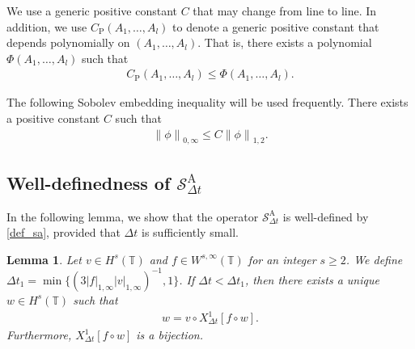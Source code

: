 \documentclass[10pt,a4paper,tbtags,leqno]{amsart}
\newtheorem{lemma}[theorem]{Lemma}
\theoremstyle{definition}
\numberwithin{equation}{section}
\def\norm#1#2{\left\|#2\right\|_{#1}}
\def\snorm#1#2{\left|#2\right|_{#1}}
\begin{document}
We use a generic positive constant $ C $ that may change from line to line.  In addition, we use $ C_{\mathrm{P}} (A_1, \ldots, A_l) $ to denote a generic positive constant that depends polynomially on $ (A_1, \ldots, A_l) $. That is, there exists a polynomial $ \Phi (A_1, \ldots, A_l) $ such that 
\begin{align} 
  C_{\mathrm{P}} (A_1, \ldots, A_l) \leq \Phi (A_1, \ldots, A_l). 
\end{align} 

The following Sobolev embedding inequality will be used frequently. There exists a positive constant $ C $ such that 
\begin{align}
  \norm{0, \infty}{\phi} \leq C \norm{1, 2}{\phi}. \label{a23-emb} 
\end{align} 

\subsection{Well-definedness of $\mathcal{S}_{\Delta t}^{\mathrm{A}}$} \label{ss:2-3} In the following lemma, we show that the operator $ \mathcal{S}_{\Delta t}^{\mathrm{A}} $ is well-defined by \eqref{def_sa}, provided that $ \Delta t $ is sufficiently small. 

\begin{lemma} \label{lem:s} 
  Let $ v \in H^s (\mathbb{T}) $ and $ f \in W^{s, \infty} (\mathbb{T}) $ for an integer $ s \geq 2 $. We define $ \Delta t_1 = \min\{(3 \snorm{1, \infty}{f} \snorm{1, \infty}{v})^{-1}, 1\} $. If $ \Delta t < \Delta t_1 $, then there exists a unique $ w \in H^s (\mathbb{T}) $ such that 
  \begin{align} 
    w = v \circ {X_{\Delta t}^1}[f \circ w]. \label{a1} 
  \end{align} 
  Furthermore, $ {X_{\Delta t}^1}[f \circ w] $ is a bijection. 
\end{lemma} 
\end{document}
